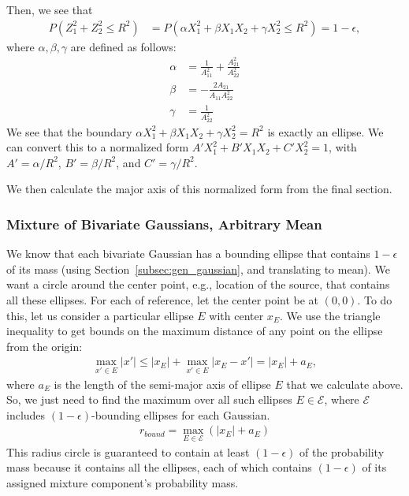 \documentclass[11pt]{article}
\begin{document}
Then, we see that
\begin{align*}
P(Z_1^2 + Z_2^2 \leq R^2) &= P\left(\alpha X_1^2 + \beta X_1 X_2 + \gamma X_2^2 \leq R^2\right) = 1 - \epsilon,
\end{align*}
where $\alpha, \beta, \gamma$ are defined as follows:
\begin{align*}
\alpha &= \frac{1}{A_{11}^2} + \frac{A_{21}^2}{A_{22}^2} \\
\beta &= -\frac{2A_{21}}{A_{11} A_{22}^2} \\
\gamma &= \frac{1}{A_{22}^2}
\end{align*}
We see that the boundary $\alpha X_1^2 + \beta X_1 X_2 + \gamma X_2^2 = R^2$ is exactly an ellipse.
We can convert this to a normalized form $A' X_1^2 + B' X_1 X_2 + C' X_2^2 = 1$, with
$A' = \alpha / R^2$, $B' = \beta / R^2$, and $C' = \gamma / R^2$.

We then calculate the major axis of this normalized form from the final section.

\subsubsection{Mixture of Bivariate Gaussians, Arbitrary Mean}

We know that each bivariate Gaussian has a bounding ellipse that contains $1 - \epsilon$ of its mass (using
Section~\ref{subsec:gen_gaussian}, and translating to mean). We want a circle around the center point, e.g., location
of the source, that contains all these ellipses. For each of reference, let the center point be at $(0, 0)$.
To do this, let us consider a particular ellipse $E$ with center $x_E$. We use the triangle inequality to get bounds on
the maximum distance of any point on the ellipse from the origin:
\begin{align*}
\max_{x' \in E} |x'| \leq |x_E| + \max_{x' \in E} |x_E - x'|= |x_E| + a_E,
\end{align*}
where $a_E$ is the length of the semi-major axis of ellipse $E$ that we calculate above. So, we just need to
find the maximum over all such ellipses $E \in \mathcal{E}$, where $\mathcal{E}$ includes $(1 - \epsilon)$-bounding ellipses
for each Gaussian.
\begin{align*}
r_{bound} = \max_{E \in \mathcal{E}}\left(|x_E| + a_E\right)
\end{align*}
This radius circle is guaranteed to contain at least $(1 - \epsilon)$ of the probability mass because it contains
all the ellipses, each of which contains $(1 - \epsilon)$ of its assigned mixture component's probability mass.
\end{document}
